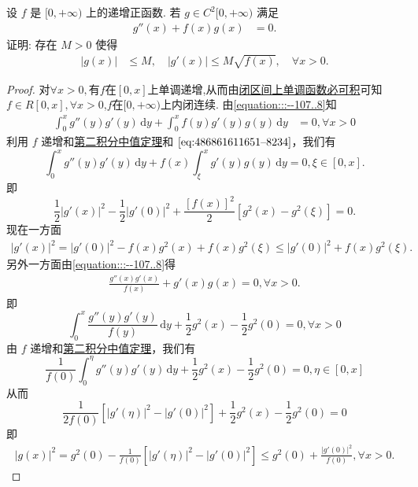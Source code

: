 \documentclass[../../main.tex]{subfiles}
\begin{document}
\begin{example}
设 \( f \) 是 \( [0,+\infty) \) 上的递增正函数. 若 \( g \in C^2[0,+\infty) \) 满足
\begin{align}
g''(x) + f(x)g(x) &= 0.\label{equation:::--107..8}
\end{align}
证明: 存在 \( M > 0 \) 使得
\begin{align}
|g(x)| &\leq M, \quad |g'(x)| \leq M\sqrt{f(x)}, \quad \forall x > 0.\label{equation:::--107..9}
\end{align}
\end{example}
\begin{proof}
对$\forall x>0,$有$f$在$[0,x]$上单调递增,从而由\hyperref[theorem:闭区间上单调函数必可积]{闭区间上单调函数必可积}可知$f\in R[0,x],\forall x>0$,$f$在$[0,+\infty)$上内闭连续.
由\eqref{equation:::--107..8}知
\begin{align}
\int_0^x g''(y)g'(y)\,\mathrm{d}y + \int_0^x f(y)g'(y)g(y)\,\mathrm{d}y &= 0, \forall x > 0 \label{eq:486861611651--8234}
\end{align}
利用 \( f \) 递增和\hyperref[theorem:积分中值定理(2)]{第二积分中值定理}和 \(\eqref{eq:486861611651--8234}\)，我们有
\[
\int_0^x g''(y)g'(y)\,\mathrm{d}y + f(x)\int_\xi^x g'(y)g(y)\,\mathrm{d}y = 0, \xi \in [0, x].
\]
即
\[
\frac{1}{2}\lvert g'(x)\rvert^2 - \frac{1}{2}\lvert g'(0)\rvert^2 + \frac{[f(x)]^2}{2}\left[g^2(x) - g^2(\xi)\right] = 0.
\]
现在一方面
\begin{align}
\lvert g'(x)\rvert^2 = \lvert g'(0)\rvert^2 - f(x)g^2(x) + f(x)g^2(\xi) \leqslant \lvert g'(0)\rvert^2 + f(x)g^2(\xi).\label{eq:::--123124523-1214} 
\end{align}
另外一方面由\eqref{equation:::--107..8}得
\begin{align*}
\frac{g''(x)g'(x)}{f(x)} + g'(x)g(x) = 0, \forall x > 0. 
\end{align*}
即
\[
\int_0^x \frac{g''(y)g'(y)}{f(y)}\,\mathrm{d}y + \frac{1}{2}g^2(x) - \frac{1}{2}g^2(0) = 0, \forall x > 0
\]
由 \( f \) 递增和\hyperref[theorem:积分中值定理(1)]{第二积分中值定理}，我们有
\[
\frac{1}{f(0)}\int_0^\eta g''(y)g'(y)\,\mathrm{d}y + \frac{1}{2}g^2(x) - \frac{1}{2}g^2(0) = 0, \eta \in [0, x]
\]
从而
\[
\frac{1}{2f(0)}\left[\lvert g'(\eta)\rvert^2 - \lvert g'(0)\rvert^2\right] + \frac{1}{2}g^2(x) - \frac{1}{2}g^2(0) = 0
\]
即
\begin{align}
\lvert g(x)\rvert^2 = g^2(0) - \frac{1}{f(0)}\left[\lvert g'(\eta)\rvert^2 - \lvert g'(0)\rvert^2\right] \leqslant g^2(0) + \frac{\lvert g'(0)\rvert^2}{f(0)},\forall x>0.\label{eq:::--123124523-1211}
\end{align}

\end{proof}
\end{document}
